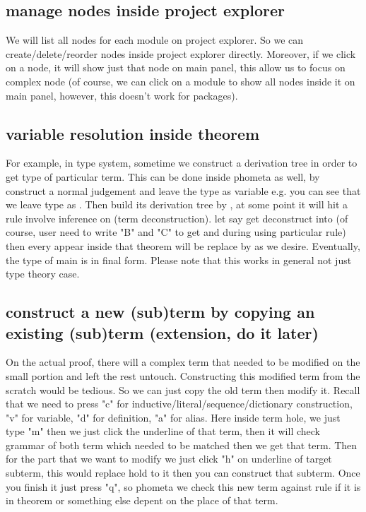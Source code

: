 \subsection{manage nodes inside project explorer}

We will list all nodes for each module on project explorer. So we can create/delete/reorder nodes inside project explorer directly. Moreover, if we click on a node, it will show just that node on main panel, this allow us to focus on complex node (of course, we can click on a module to show all nodes inside it on main panel, however, this doesn't work for packages).

\subsection{variable resolution inside theorem}

For example, in type system, sometime we construct a derivation tree in order to get type of particular term. This can be done inside phometa as well, by construct a normal judgement and leave the type as variable e.g.  you can see that we leave type as . Then build its derivation tree by \kTheorem, at some point it will hit a rule involve inference on  (term deconstruction). let say  get deconstruct into  (of course, user need to write "B" and "C" to get  and  during using particular rule) then every  appear inside that theorem will be replace by  as we desire. Eventually, the type of main is in final form. Please note that this works in general not just type theory case.

\subsection{construct a new (sub)term by copying an existing (sub)term (extension, do it later)}

On the actual proof, there will a complex term that needed to be modified on the small portion and left the rest untouch. Constructing this modified term from the scratch would be tedious. So we can just copy the old term then modify it. Recall that we need to press "c" for inductive/literal/sequence/dictionary construction, "v" for variable, "d" for definition, "a" for alias. Here inside term hole, we just type "m" then we just click the underline of that term, then it will check grammar of both term which needed to be matched then we get that term. Then for the part that we want to modify we just click "h" on underline of target subterm, this would replace hold to it then you can construct that subterm. Once you finish it just press "q", so phometa we check this new term against rule if it is in theorem or something else depent on the place of that term.
